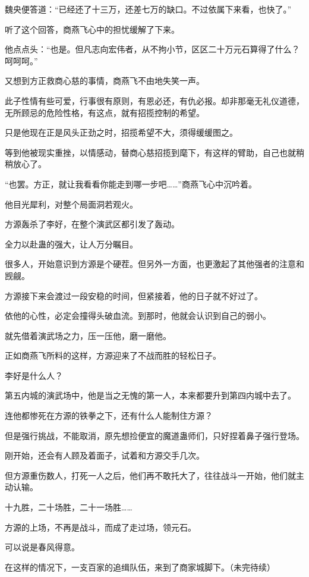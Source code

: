 \begin{this_body}
魏央便答道：“已经还了十三万，还差七万的缺口。不过依属下来看，也快了。”

听了这个回答，商燕飞心中的担忧缓解了下来。

他点点头：“也是。但凡志向宏伟者，从不拘小节，区区二十万元石算得了什么？呵呵呵。”

又想到方正救商心慈的事情，商燕飞不由地失笑一声。

此子性情有些可爱，行事很有原则，有恩必还，有仇必报。却非那毫无礼仪道德，无所顾忌的危险性格，有这点，就有招揽控制的希望。

只是他现在正是风头正劲之时，招揽希望不大，须得缓缓图之。

等到他被现实重挫，以情感动，替商心慈招揽到麾下，有这样的臂助，自己也就稍稍放心了。

“也罢。方正，就让我看看你能走到哪一步吧……”商燕飞心中沉吟着。

他目光犀利，对整个局面洞若观火。

方源轰杀了李好，在整个演武区都引发了轰动。

全力以赴蛊的强大，让人万分瞩目。

很多人，开始意识到方源是个硬茬。但另外一方面，也更激起了其他强者的注意和觊觎。

方源接下来会渡过一段安稳的时间，但紧接着，他的日子就不好过了。

依他的心性，必定会撞得头破血流。到那时，他就会认识到自己的弱小。

就先借着演武场之力，压一压他，磨一磨他。

正如商燕飞所料的这样，方源迎来了不战而胜的轻松日子。

李好是什么人？

第五内城的演武场中，他是当之无愧的第一人，本来都要升到第四内城中去了。

连他都惨死在方源的铁拳之下，还有什么人能制住方源？

但是强行挑战，不能取消，原先想捡便宜的魔道蛊师们，只好捏着鼻子强行登场。

刚开始，还会有人顾及着面子，试着和方源交手几次。

但方源重伤数人，打死一人之后，他们再不敢托大了，往往战斗一开始，他们就主动认输。

十九胜，二十场胜，二十一场胜……

方源的上场，不再是战斗，而成了走过场，领元石。

可以说是春风得意。

在这样的情况下，一支百家的追缉队伍，来到了商家城脚下。（未完待续）

\end{this_body}

